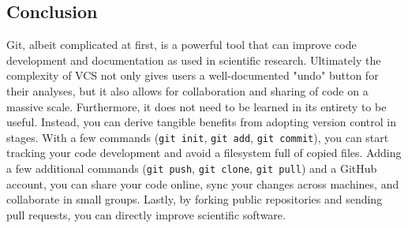 \subsection{Conclusion}

Git, albeit complicated at first, is a powerful tool that can improve code development and documentation as used in scientific research.
Ultimately the complexity of VCS not only gives users a well-documented "undo" button for their analyses, but it also allows for collaboration and sharing of code on a massive scale.
Furthermore, it does not need to be learned in its entirety to be useful.
Instead, you can derive tangible benefits from adopting version control in stages.
With a few commands (\verb|git init|, \verb|git add|, \verb|git commit|), you can start tracking your code development and avoid a filesystem full of copied files.
Adding a few additional commands (\verb|git push|, \verb|git clone|, \verb|git pull|) and a GitHub account, you can share your code online, sync your changes across machines, and collaborate in small groups.
Lastly, by forking public repositories and sending pull requests, you can directly improve scientific software.
